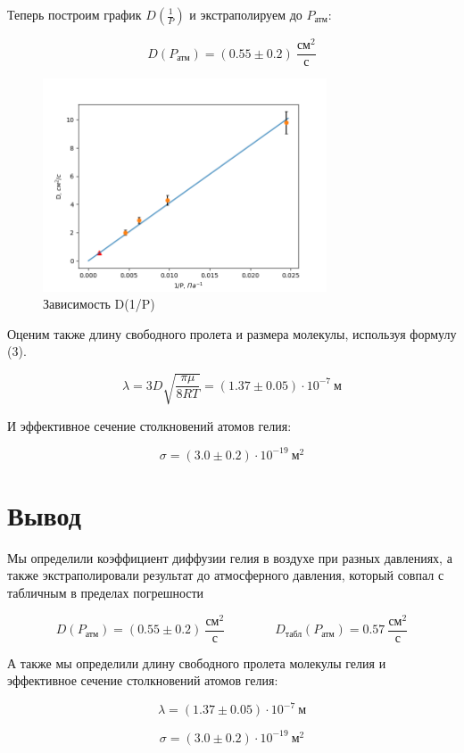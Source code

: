 \documentclass[a4paper]{article}
\begin{document}
Теперь построим график $D(\frac{1}{P})$ и экстраполируем до $P_\text{атм}$:

\begin{equation}
    D(P_\text{атм}) = (0.55 \pm 0.2) \ \frac{\text{см}^2}{\text{с}}
\end{equation}

\begin{figure}[h!]
    \centering
    \includegraphics[width = 0.75\textwidth]{D_P.png}
    \caption{Зависимость D(1/P)}
\end{figure}

Оценим также длину свободного пролета и размера молекулы, используя формулу (3).

\begin{equation}
    \lambda = 3 D \sqrt{\frac{\pi \mu}{8RT}} = (1.37 \pm 0.05) \cdot 10^{-7} \ \text{м}
\end{equation}

И эффективное сечение столкновений атомов гелия:

\begin{equation}
    \sigma = (3.0 \pm 0.2) \cdot 10^{-19} \ \text{м}^2
\end{equation}

\newpage

\section{Вывод}

Мы определили коэффициент диффузии гелия в воздухе при разных давлениях,
а также экстраполировали результат до атмосферного давления,
который совпал с табличным в пределах погрешности

\begin{equation*}
    D(P_\text{атм}) = (0.55 \pm 0.2) \ \frac{\text{см}^2}{\text{с}} \qquad \qquad D_\text{табл}(P_\text{атм}) = 0.57 \ \frac{\text{см}^2}{\text{с}}
\end{equation*}

А также мы определили длину свободного пролета молекулы гелия и эффективное сечение
столкновений атомов гелия:

\begin{equation}
    \lambda = (1.37 \pm 0.05) \cdot 10^{-7} \ \text{м}
\end{equation}

\begin{equation}
    \sigma = (3.0 \pm 0.2) \cdot 10^{-19} \ \text{м}^2
\end{equation}
\end{document}
